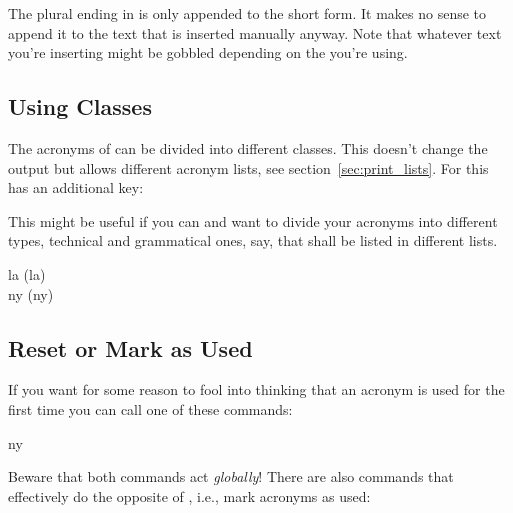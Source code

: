 \documentclass[DIV10,toc=index,toc=bib,hyperfootnotes=false]{cnpkgdoc}
\makeatletter
\providecommand*\sinceversion[1]{%
  \@bsphack
  \marginnote{%
    \footnotesize\sffamily\RaggedRight
    \textcolor{black!75}{Introduced in version~#1}}%
  \@esphack}
\makeatother
\begin{document}
\begin{beispiel}
\end{beispiel}

The plural ending in  is only appended to the short form. It makes
no sense to append it to the text that is inserted manually anyway. Note that
whatever text you're inserting might be gobbled depending on the 
you're using.

\subsection{Using Classes}
The acronyms of \acro can be divided into different classes. This doesn't change
the output but allows different acronym lists, see section~\ref{sec:print_lists}.
For this  has an additional key:
\begin{beschreibung}
\end{beschreibung}

This might be useful if you can and want to divide your acronyms into different
types, technical and grammatical ones, say, that shall be listed in different
lists.

\begin{beispiel}
 \acl{la} (\acs{la}) \\
 \acl{ny} (\acs{ny})
\end{beispiel}

\subsection{Reset or Mark as Used}
If you want for some reason to fool \acro into thinking that an acronym is used
for the first time you can call one of these commands:
\begin{beschreibung}
 \sinceversion{0.5}
\end{beschreibung}
\begin{beispiel}
 \ac{ny}
\end{beispiel}
Beware that both commands act \emph{globally}! There are also commands that
effectively do the opposite of , i.e., mark acronyms as used:
\begin{beschreibung}
 \sinceversion{0.5}
 \sinceversion{0.6a}
\end{beschreibung}
\end{document}

